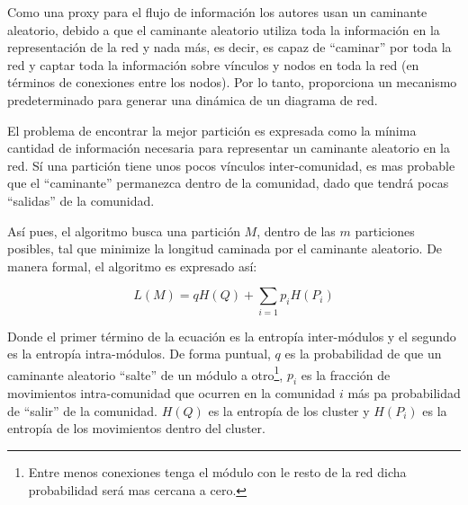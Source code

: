 \documentclass[12pt,letter]{article}
\begin{document}
\vspace{0.5cm}

Como una proxy para el flujo de información los autores usan un caminante aleatorio, debido a que el caminante aleatorio utiliza toda la información en la representación de la red y nada más, es decir, es capaz de ``caminar'' por toda la red y captar toda la información sobre vínculos y nodos en toda la red (en términos de conexiones entre los nodos). Por lo tanto, proporciona un mecanismo predeterminado para generar una dinámica de un diagrama de red.

\vspace{0.5cm}

El problema de encontrar la mejor partición es expresada como la mínima cantidad de información necesaria para representar un caminante aleatorio en la red. Sí una partición tiene unos pocos vínculos inter-comunidad, es mas probable que el ``caminante'' permanezca dentro de la comunidad, dado que tendrá pocas ``salidas'' de la comunidad.

\vspace{0.5cm}

Así pues, el algoritmo busca una partición $M$, dentro de las $m$ particiones posibles, tal que minimize la longitud caminada por el caminante aleatorio. De manera formal, el algoritmo es expresado así:


\begin{equation}
L(M)=q H(Q) + \sum_{i=1} p_i H(P_i)
\label{Ecu5}
\end{equation}

\vspace{0.5cm}

Donde el primer término de la ecuación es la entropía inter-módulos y el segundo es la entropía intra-módulos. De forma puntual, $q$ es la probabilidad de que un caminante aleatorio ``salte'' de un módulo a otro\footnote{Entre menos conexiones tenga el módulo con le resto de la red dicha probabilidad será mas cercana a cero.}, $p_i$ es la fracción de movimientos intra-comunidad que ocurren en la comunidad $i$ más pa probabilidad de ``salir'' de la comunidad. $H(Q)$ es la entropía de los cluster y $H(P_i)$ es la entropía de los movimientos dentro del cluster.

\end{document}
